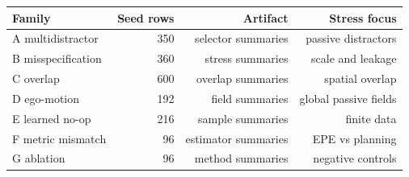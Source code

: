 \begin{tabular}{lrrr}
\toprule
Family & Seed rows & Artifact & Stress focus\\
\midrule
A multidistractor & 350 & selector summaries & passive distractors\\
B misspecification & 360 & stress summaries & scale and leakage\\
C overlap & 600 & overlap summaries & spatial overlap\\
D ego-motion & 192 & field summaries & global passive fields\\
E learned no-op & 216 & sample summaries & finite data\\
F metric mismatch & 96 & estimator summaries & EPE vs planning\\
G ablation & 96 & method summaries & negative controls\\
\bottomrule
\end{tabular}
